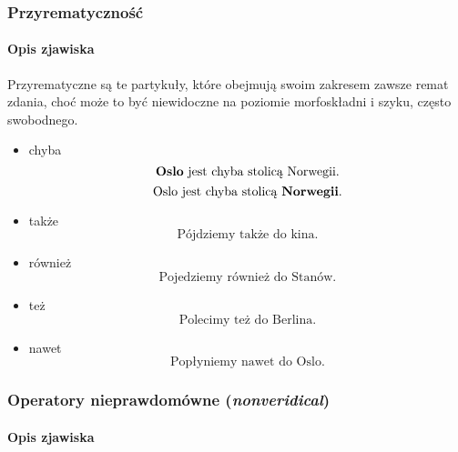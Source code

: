 \documentclass[12pt]{mwart}
\theoremstyle{remark}
\begin{document}
\subsubsection{Przyrematyczność}
\paragraph{Opis zjawiska} %
\label{sub:opis_zjawiska2}
Przyrematyczne są te partykuły, które obejmują swoim zakresem zawsze remat zdania, choć może to być niewidoczne na poziomie morfoskładni i szyku, często swobodnego.
\begin{itemize}
\item chyba
\begin{equation}
	\text{\textbf{Oslo} jest chyba stolicą Norwegii.}
\end{equation}
\begin{equation}
	\text{Oslo jest chyba stolicą \textbf{Norwegii}.}
\end{equation}
\item także
\begin{equation}
	\text{Pójdziemy także do kina.}
\end{equation}
\item również
\begin{equation}
	\text{Pojedziemy również do Stanów.}
\end{equation}
\item też
\begin{equation}
	\text{Polecimy też do Berlina.}
\end{equation}
\item nawet
\begin{equation}
	\text{Popłyniemy nawet do Oslo.}
\end{equation}


\end{itemize}


\subsubsection{Operatory nieprawdomówne (\emph{nonveridical})}
\paragraph{Opis zjawiska} %
\label{sub:opis_zjawiska3}
\end{document}
